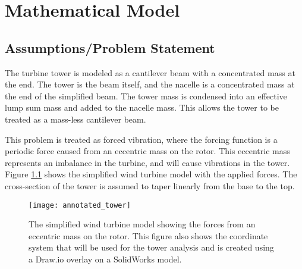 \chapter{Mathematical Model} %

\label{ch_math_model}


\section{Assumptions/Problem Statement}

The turbine tower is modeled as a cantilever beam with a concentrated mass at the end.  The tower is the beam itself, and the nacelle is a concentrated mass at the end of the simplified beam.  The tower mass is condensed into an effective lump sum mass and added to the nacelle mass.  This allows the tower to be treated as a mass-less cantilever beam.

This problem is treated as forced vibration, where the forcing function is a periodic force caused from an eccentric mass on the rotor.  This eccentric mass represents an imbalance in the turbine, and will cause vibrations in the tower.   Figure \ref{fig:annotated_tower} shows the simplified wind turbine model with the applied forces. The cross-section of the tower is assumed to taper linearly from the base to the top.

\begin{figure}
	\centering
	\texttt{[image: annotated\_tower]}
	\decoRule
	\caption{The simplified wind turbine model showing the forces from an eccentric mass on the rotor.  This figure also shows the coordinate system that will be used for the tower analysis and is created using a Draw.io overlay on a SolidWorks model.}
	\label{fig:annotated_tower}
\end{figure}


